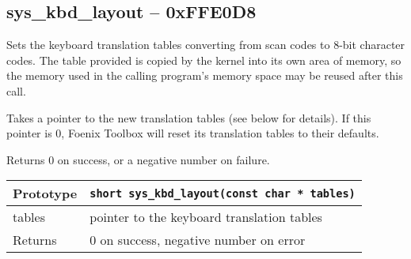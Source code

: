 \subsection*{sys\_kbd\_layout -- 0xFFE0D8}
Sets the keyboard translation tables converting from scan codes to 8-bit character codes. The table provided is copied by the kernel into its own area of memory, so the memory used in the calling program's memory space may be reused after this call.

Takes a pointer to the new translation tables (see below for details). If this pointer is 0, Foenix Toolbox will reset its translation tables to their defaults.

Returns 0 on success, or a negative number on failure.

\bigskip

\begin{tabular}{|l||l|} \hline
Prototype & \lstinline!short sys_kbd_layout(const char * tables)! \\ \hline
tables & pointer to the keyboard translation tables \\ \hline
Returns & 0 on success, negative number on error \\ \hline
\end{tabular}
